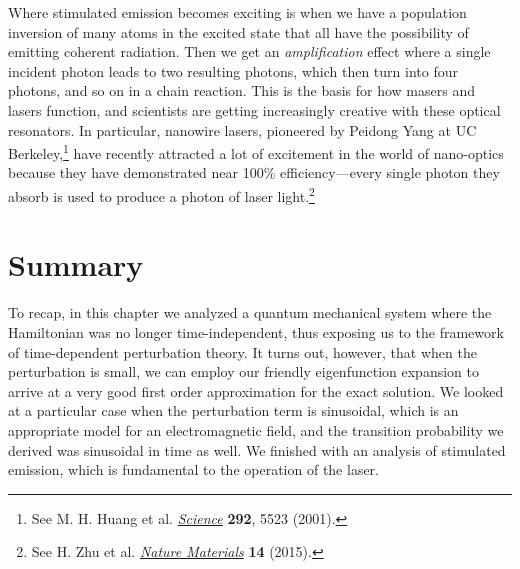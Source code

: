 Where stimulated emission becomes exciting is when we have a population inversion of many atoms in the excited state that all have the possibility of emitting coherent radiation. Then we get an \emph{amplification} effect where a single incident photon leads to two resulting photons, which then turn into four photons, and so on in a chain reaction. This is the basis for how masers and lasers function, and scientists are getting increasingly creative with these optical resonators. In particular, nanowire lasers, pioneered by Peidong Yang at UC Berkeley,\footnote{See M. H. Huang et al. \href{http://science.sciencemag.org/content/292/5523/1897.full}{\emph{Science}} \textbf{292}, 5523 (2001).} have recently attracted a lot of excitement in the world of nano-optics because they have demonstrated near 100\% efficiency---every single photon they absorb is used to produce a photon of laser light.\footnote{See H. Zhu et al. \href{http://www.nature.com/nmat/journal/v14/n6/full/nmat4271.html}{\emph{Nature Materials}} \textbf{14} (2015).}


\section{Summary}
To recap, in this chapter we analyzed a quantum mechanical system where the Hamiltonian was no longer time-independent, thus exposing us to the framework of time-dependent perturbation theory. It turns out, however, that when the perturbation is small, we can employ our friendly eigenfunction expansion to arrive at a very good first order approximation for the exact solution. We looked at a particular case when the perturbation term is sinusoidal, which is an appropriate model for an electromagnetic field, and the transition probability we derived was sinusoidal in time as well. We finished with an analysis of stimulated emission, which is fundamental to the operation of the laser.

%